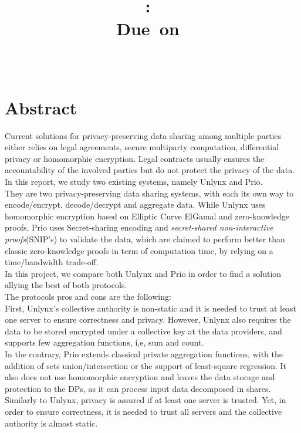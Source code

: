 \documentclass{article}
\title{
\logoepfl
\vspace{2in}
\textmd{\textbf{\hmwkClass:\ \hmwkTitle}}\\
\normalsize\vspace{0.1in}\small{Due\ on\ \hmwkDueDate}\\
\vspace{0.1in}\large{\textit{\hmwkClassInstructor\ \hmwkClassTime}}
\author{\textbf{\hmwkAuthorName}}
\vspace{3in}
}
\begin{document}
\maketitle

\newpage
\section*{Abstract}
Current solutions for privacy-preserving data sharing among multiple parties either relies on legal agreements, secure multiparty computation, differential privacy or homomorphic encryption. Legal contracts usually ensures the accountability of the involved parties but do not protect the privacy of the data.
In this report, we study two existing systems, namely Unlynx and Prio.\\
They are two privacy-preserving data sharing systems, with each its own way to encode/encrypt, decode/decrypt and aggregate data. While Unlynx \cite{unlynx} uses homomorphic encryption based on Elliptic Curve ElGamal and zero-knowledge proofs, Prio \cite{prio} uses Secret-sharing encoding and \textit{secret-shared non-interactive proofs}(SNIP's) to validate the data, which are claimed to perform better than classic zero-knowledge proofs \cite{proof1,proof2} in term of computation time, by relying on a time/bandwidth trade-off.\\
In this project, we compare both Unlynx and Prio in order to find a solution allying the best of both protocols.\\
The protocols pros and cons are the following:\\
First, Unlynx's collective authority is non-static and it is needed to trust at least one server to ensure correctness and privacy. However, Unlynx also requires the data to be stored encrypted under a collective key at the data providers, and supports few aggregation functions, i,e, sum and count.\\
In the contrary, Prio extends classical private aggregation functions, with the addition of sets union/intersection or the support of least-square regression. It also does not use homomorphic encryption and leaves the data storage and protection to the DPs, as it can process input data decomposed in shares. Similarly to Unlynx, privacy is assured if at least one server is trusted.
Yet, in order to ensure correctness, it is needed to trust all servers and the collective authority is almost static.\\
\end{document}
